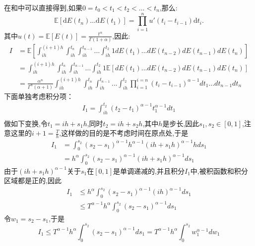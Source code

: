 \documentclass[12pt,final]{article}
\makeatletter
\numberwithin{equation}{section}
\numberwithin{figure}{section}
\numberwithin{table}{section}
\theoremstyle{plain}
\renewcommand{\proofname}{proof}
\theoremstyle{Definition}
\theoremstyle{Remark}
\renewenvironment{proof}[1][\proofname]{\par
	\pushQED{\qed}%
	\normalfont \topsep6\p@\@plus6\p@\relax
	\trivlist\item[\hskip\labelsep
	\bfseries #1\@addpunct{\,:\,}]\ignorespaces
}{%
	\popQED\endtrivlist\@endpefalse
}
\makeatother
\begin{document}
	
	\begin{proof}    
		在\cite{daley2003introduction}和\cite{magdziarz2009stochastic}中可以直接得到,如果$0 = t_0 < t_1 < t_2 < \ldots <t_n$,那么:
		\begin{equation*}
			\mathbb{E}[\mathrm dE(t_n)\ldots\mathrm dE(t_1)]=\prod_{i=1}^nu'(t_i-t_{i-1})\mathrm dt_i.
		\end{equation*}
		其中$u(t)=\mathbb{E}[E(t)]=\frac{t^\alpha}{\Gamma(1+\alpha)}$,因此:
		\begin{align*}
			I &= \mathbb{E}\left[\int_{ih}^{(i+1)h}
			\int_{ih}^{t_n}\int_{ih}^{t_{n-1}} \ldots \int_{ih}^{t_{2}} 1 dE(t_1) \ldots dE(t_{n-2})dE(t_{n-1})dE(t_n)\right] \\
			& = \int_{ih}^{(i+1)h}\int_{ih}^{t_n}\int_{ih}^{t_{n-1}}
			\ldots \int_{ih}^{t_{2}} 1 \mathbb{E}\left[dE(t_1) \ldots dE(t_{n-2})dE(t_{n-1})dE(t_n)\right] \\
			& = \frac{\alpha^n}{\Gamma^n(\alpha+1)}
			\int_{ih}^{(i+1)h}\int_{ih}^{t_n}\int_{ih}^{t_{n-1}} \ldots \int_{ih}^{t_{2}} \prod_{i=1}^{i=n}(t_i-t_{i-1})^{\alpha -1} dt_1 \ldots dt_{n-1}dt_n
		\end{align*}
		下面单独考虑积分项：
		\begin{align*}
			I_{1}=\int_{ih}^{t_{2}} (t_{2}-t_1)^{\alpha -1} t_1^{\alpha - 1} dt_1 \\
		\end{align*}
		做如下变换,令$t_{1} = ih + s_{1}h$,同时$t_2 = ih + s_2h$,其中$h$是步长,因此$s_1,s_{2} \in [0,1]$,注意这里的$i+1=\frac{T}{h}$,这样做的目的是不考虑时间在原点处,于是
		\begin{align*}
			I_1 &= \int_{0}^{s_{2}} (s_{2}-s_{1})^{\alpha -1}h^{\alpha -1} (ih + s_1h)^{\alpha - 1}h ds_1 \\
			&= h^{\alpha}\int_{0}^{s_{2}} (s_{2}-s_{1})^{\alpha -1} (ih + s_1h)^{\alpha - 1} ds_1
		\end{align*}
		由于$(ih + s_1h)^{\alpha - 1}$关于$s_1$在$[0,1]$是单调递减的,并且积分$I_1$中,被积函数和积分区域都是正的,因此
		\begin{align*}
			I_1 &\le h^{\alpha}\int_{0}^{s_{2}} (s_{2}-s_{1})^{\alpha -1} (ih)^{\alpha - 1} ds_1 \\
			&\le  T^{\alpha - 1}h^{\alpha}\int_{0}^{s_{2}} (s_{2}-s_{1})^{\alpha -1} ds_1
		\end{align*}
		令$w_1=s_{2}-s_{1}$,于是
		\begin{equation*}
			I_1\le T^{\alpha - 1}h^{\alpha}\int_{0}^{s_{2}} (s_{2}-s_{1})^{\alpha -1} ds_1
			=  T^{\alpha - 1}h^{\alpha}\int_{0}^{s_{2}} w_1^{\alpha -1} dw_1

\end{equation*}
\end{proof}
\end{document}
